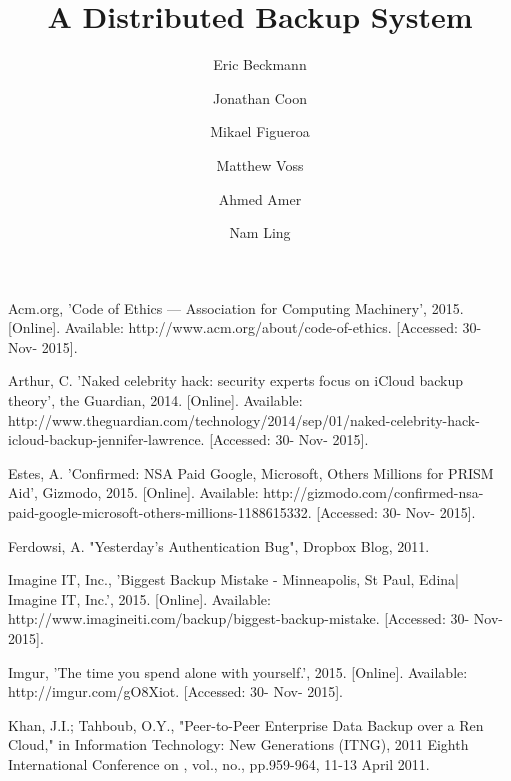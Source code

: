 \documentclass{scu-thesis}
\author{Eric Beckmann}
\author{Jonathan Coon}
\author{Mikael Figueroa}
\author{Matthew Voss}
\title{A Distributed Backup System}
\begin{document}
\frontmatter
\signature{Ahmed Amer}
\signature{Nam Ling}

\maketitle



\tableofcontents
\listoffigures

\mainmatter













%
%

\begin{thebibliography}{9}

Acm.org, 'Code of Ethics            —                Association for Computing Machinery', 2015. [Online]. Available: http://www.acm.org/about/code-of-ethics. [Accessed: 30- Nov- 2015].

Arthur, C. 'Naked celebrity hack: security experts focus on iCloud backup theory', the Guardian, 2014. [Online]. Available: http://www.theguardian.com/technology/2014/sep/01/naked-celebrity-hack-icloud-backup-jennifer-lawrence. [Accessed: 30- Nov- 2015].

Estes, A. 'Confirmed: NSA Paid Google, Microsoft, Others Millions for PRISM Aid', Gizmodo, 2015. [Online]. Available: http://gizmodo.com/confirmed-nsa-paid-google-microsoft-others-millions-1188615332. [Accessed: 30- Nov- 2015].

Ferdowsi, A. "Yesterday's Authentication Bug", Dropbox Blog, 2011.

Imagine IT, Inc., 'Biggest Backup Mistake - Minneapolis, St Paul, Edina| Imagine IT, Inc.', 2015. [Online]. Available: http://www.imagineiti.com/backup/biggest-backup-mistake. [Accessed: 30- Nov- 2015].

Imgur, 'The time you spend alone with yourself.', 2015. [Online]. Available: http://imgur.com/gO8Xiot. [Accessed: 30- Nov- 2015].

Khan, J.I.; Tahboub, O.Y., "Peer-to-Peer Enterprise Data Backup over a Ren Cloud," in Information Technology: New Generations (ITNG), 2011 Eighth International Conference on , vol., no., pp.959-964, 11-13 April 2011.


\end{thebibliography}
\end{document}
